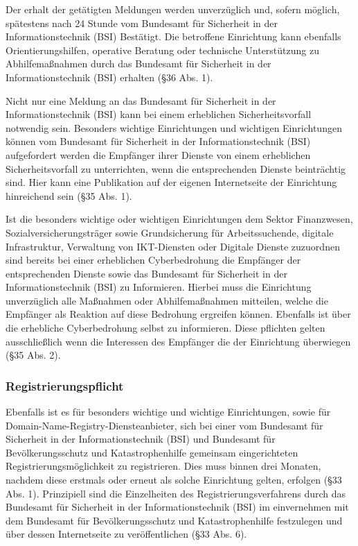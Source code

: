 \documentclass[11pt,a4paper]{article}   %
\begin{document}
        Der erhalt der getätigten Meldungen werden unverzüglich und, sofern möglich, spätestens nach 24 Stunde vom Bundesamt für Sicherheit in der Informationstechnik (BSI) Bestätigt. Die betroffene Einrichtung kann ebenfalls Orientierungshilfen, operative Beratung oder technische Unterstützung zu Abhilfemaßnahmen durch das Bundesamt für Sicherheit in der Informationstechnik (BSI) erhalten (§36 Abs. 1).

        Nicht nur eine Meldung an das Bundesamt für Sicherheit in der Informationstechnik (BSI) kann bei einem erheblichen Sicherheitsvorfall notwendig sein. Besonders wichtige Einrichtungen und wichtigen Einrichtungen können vom Bundesamt für Sicherheit in der Informationstechnik (BSI) aufgefordert werden die Empfänger ihrer Dienste von einem erheblichen Sicherheitsvorfall zu unterrichten, wenn die entsprechenden Dienste beinträchtig sind. Hier kann eine Publikation auf der eigenen Internetseite der Einrichtung hinreichend sein (§35 Abs. 1).

        Ist die besonders wichtige oder wichtigen Einrichtungen dem Sektor Finanzwesen, Sozialversicherungsträger sowie Grundsicherung für Arbeitssuchende, digitale Infrastruktur, Verwaltung von IKT-Diensten oder Digitale Dienste zuzuordnen sind bereits bei einer erheblichen Cyberbedrohung die Empfänger der entsprechenden Dienste sowie das Bundesamt für Sicherheit in der Informationstechnik (BSI) zu Informieren. Hierbei muss die Einrichtung unverzüglich alle Maßnahmen oder Abhilfemaßnahmen mitteilen, welche die Empfänger als Reaktion auf diese Bedrohung ergreifen können. Ebenfalls ist über die erhebliche Cyberbedrohung selbst zu informieren. Diese pflichten gelten ausschließlich wenn die Interessen des Empfänger die der Einrichtung überwiegen (§35 Abs. 2).

        \subsubsection{Registrierungspflicht}
        Ebenfalls ist es für besonders wichtige und wichtige Einrichtungen, sowie für Domain-Name-Registry-Diensteanbieter, sich bei einer vom Bundesamt für Sicherheit in der Informationstechnik (BSI) und Bundesamt für Bevölkerungsschutz und Katastrophenhilfe  gemeinsam eingerichteten Registrierungsmöglichkeit zu registrieren. Dies muss binnen drei Monaten, nachdem diese erstmals oder erneut als solche Einrichtung gelten, erfolgen (§33 Abs. 1). Prinzipiell sind die Einzelheiten des Registrierungsverfahrens durch das Bundesamt für Sicherheit in der Informationstechnik (BSI) im einvernehmen mit dem Bundesamt für Bevölkerungsschutz und Katastrophenhilfe festzulegen und über dessen Internetseite zu veröffentlichen (§33 Abs. 6).
\end{document}

